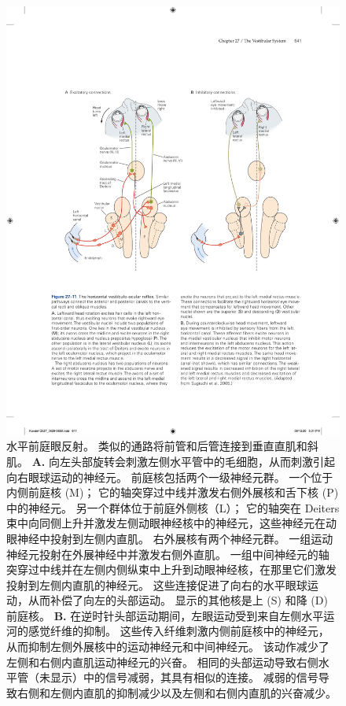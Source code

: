 \begin{figure}[htbp]
	\centering
	\includegraphics[width=0.9\linewidth]{chap27/fig_27_11}
	\caption{水平前庭眼反射。 类似的通路将前管和后管连接到垂直直肌和斜肌。
		\textbf{A.} 向左头部旋转会刺激左侧水平管中的毛细胞，从而刺激引起向右眼球运动的神经元。
		前庭核包括两个一级神经元群。
		一个位于内侧前庭核 (M)；
		它的轴突穿过中线并激发右侧外展核和舌下核 (P) 中的神经元。
		另一个群体位于前庭外侧核（L）；
		它的轴突在 Deiters 束中向同侧上升并激发左侧动眼神经核中的神经元，这些神经元在动眼神经中投射到左侧内直肌。
		右外展核有两个神经元群。 一组运动神经元投射在外展神经中并激发右侧外直肌。
		一组中间神经元的轴突穿过中线并在左侧内侧纵束中上升到动眼神经核，在那里它们激发投射到左侧内直肌的神经元。
		这些连接促进了向右的水平眼球运动，从而补偿了向左的头部运动。
		显示的其他核是上 (S) 和降 (D) 前庭核。
		\textbf{B.} 在逆时针头部运动期间，左眼运动受到来自左侧水平运河的感觉纤维的抑制。
		这些传入纤维刺激内侧前庭核中的神经元，从而抑制左侧外展核中的运动神经元和中间神经元。
		该动作减少了左侧和右侧内直肌运动神经元的兴奋。
		相同的头部运动导致右侧水平管（未显示）中的信号减弱，其具有相似的连接。
		减弱的信号导致右侧和左侧内直肌的抑制减少以及左侧和右侧内直肌的兴奋减少\cite{sugiuchi2005vestibular}。}
	\label{fig:27_11}
\end{figure}


